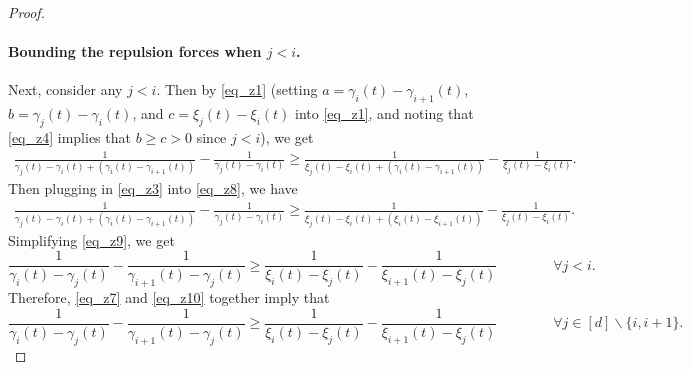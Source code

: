 \documentclass[11pt,letterpaper]{article}
\begin{document}
\begin{proof}
\paragraph{Bounding the repulsion forces when $j < i$.}  Next, consider any $j < i$.
%
Then by \eqref{eq_z1}  (setting $a = \gamma_i(t) - \gamma_{i+1}(t)$, $b=\gamma_{j}(t) - \gamma_i(t)$, and $c=\xi_{j}(t) - \xi_i(t)$ into \eqref{eq_z1}, and noting that \eqref{eq_z4} implies that $b \geq c >0$ since $j < i$), we get
%
%
\begin{align} \label{eq_z8}
\frac{1}{\gamma_{j}(t) - \gamma_i(t) + (\gamma_{i}(t) - \gamma_{i+1}(t))} - \frac{1}{\gamma_{j}(t) - \gamma_i(t)}\geq \frac{1}{\xi_{j}(t) - \xi_i(t) + (\gamma_{i}(t) - \gamma_{i+1}(t))} - \frac{1}{\xi_{j}(t) - \xi_i(t)}.
\end{align}
%
Then plugging in \eqref{eq_z3} into \eqref{eq_z8}, we have
%
\begin{align} \label{eq_z9}
\frac{1}{\gamma_{j}(t) - \gamma_i(t) + (\gamma_{i}(t) - \gamma_{i+1}(t))} - \frac{1}{\gamma_{j}(t) - \gamma_i(t)}\geq \frac{1}{\xi_{j}(t) - \xi_i(t) + (\xi_{i}(t) - \xi_{i+1}(t))} - \frac{1}{\xi_{j}(t) - \xi_i(t)}.
\end{align}
%
Simplifying \eqref{eq_z9}, we get
%
\begin{equation} \label{eq_z10}
\frac{1}{\gamma_i(t) - \gamma_{j}(t)} -\frac{1}{\gamma_{i+1}(t) - \gamma_{j}(t)}  \geq   \frac{1}{\xi_i(t)- \xi_{j}(t)} - \frac{1}{\xi_{i+1}(t)- \xi_{j}(t)} \qquad \qquad \forall j < i.
\end{equation}
%
Therefore,  \eqref{eq_z7} and \eqref{eq_z10} together imply that
%
\begin{equation} \label{eq_z11}
\frac{1}{\gamma_i(t) - \gamma_{j}(t)} -\frac{1}{\gamma_{i+1}(t) - \gamma_{j}(t)}  \geq   \frac{1}{\xi_i(t)- \xi_{j}(t)} - \frac{1}{\xi_{i+1}(t)- \xi_{j}(t)} \qquad \qquad \forall j \in [d] \backslash \{i, i+1\}.
\end{equation}


\end{proof}
\end{document}

